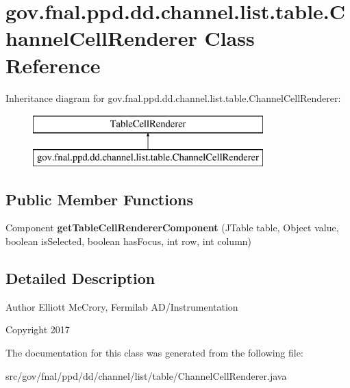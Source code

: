 \hypertarget{classgov_1_1fnal_1_1ppd_1_1dd_1_1channel_1_1list_1_1table_1_1ChannelCellRenderer}{\section{gov.\-fnal.\-ppd.\-dd.\-channel.\-list.\-table.\-Channel\-Cell\-Renderer Class Reference}
\label{classgov_1_1fnal_1_1ppd_1_1dd_1_1channel_1_1list_1_1table_1_1ChannelCellRenderer}
}
Inheritance diagram for gov.\-fnal.\-ppd.\-dd.\-channel.\-list.\-table.\-Channel\-Cell\-Renderer\-:\begin{figure}[H]
\begin{center}
\leavevmode
\includegraphics[height=2.000000cm]{classgov_1_1fnal_1_1ppd_1_1dd_1_1channel_1_1list_1_1table_1_1ChannelCellRenderer}
\end{center}
\end{figure}
\subsection*{Public Member Functions}
\begin{DoxyCompactItemize}
\item 
\hypertarget{classgov_1_1fnal_1_1ppd_1_1dd_1_1channel_1_1list_1_1table_1_1ChannelCellRenderer_a5c16a9f6ea6f40ff97232ec3397b24d1}{Component {\bfseries get\-Table\-Cell\-Renderer\-Component} (J\-Table table, Object value, boolean is\-Selected, boolean has\-Focus, int row, int column)}\label{classgov_1_1fnal_1_1ppd_1_1dd_1_1channel_1_1list_1_1table_1_1ChannelCellRenderer_a5c16a9f6ea6f40ff97232ec3397b24d1}

\end{DoxyCompactItemize}


\subsection{Detailed Description}
\begin{DoxyAuthor}{Author}
Elliott Mc\-Crory, Fermilab A\-D/\-Instrumentation 
\end{DoxyAuthor}
\begin{DoxyCopyright}{Copyright}
2017 
\end{DoxyCopyright}


The documentation for this class was generated from the following file\-:\begin{DoxyCompactItemize}
\item 
src/gov/fnal/ppd/dd/channel/list/table/Channel\-Cell\-Renderer.\-java\end{DoxyCompactItemize}
